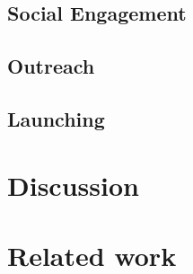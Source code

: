 \documentclass{sigchi}
\begin{document}

\subsection{Social Engagement}


\subsection{Outreach}


\subsection{Launching}


\section{Discussion}



\section{Related work}
\end{document}
